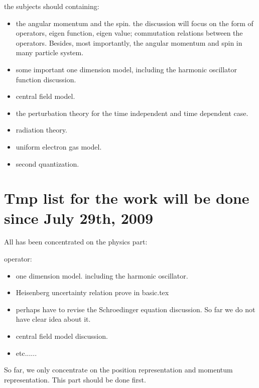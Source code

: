 the subjects should containing:
\begin{itemize}
  \item the angular
momentum and the spin. the discussion will focus on the form of
operators, eigen function, eigen value; commutation relations
between the operators. Besides, most importantly, the angular
momentum and spin in many particle system.
  \item  some important one dimension model, including the
harmonic oscillator function discussion.
  \item  central field model.
  \item  the perturbation theory for the time independent and time
  dependent case.
  \item  radiation theory.
  \item  uniform electron gas model.
  \item  second quantization.
\end{itemize}


\section{Tmp list for the work will be done since July 29th, 2009}
%
%
%
%
All has been concentrated on the physics part:

operator:
\begin{itemize}
\item one dimension model. including the harmonic oscillator.
\item Heisenberg uncertainty relation prove in basic.tex
\item perhaps have to revise the Schroedinger equation discussion. So
  far we do not have clear idea about it.
\item central field model discussion.
\item etc......
\end{itemize}


So far, we only concentrate on the position representation and
momentum representation. This part should be done first.




